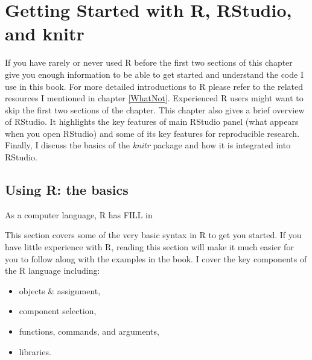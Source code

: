 



\chapter{Getting Started with R, RStudio, and knitr}\label{GettingStarted}

If you have rarely or never used R before the first two sections of this chapter give you enough information to be able to get started and understand the code I use in this book. For more detailed introductions to R please refer to the related resources I mentioned in chapter \ref{WhatNot}. Experienced R users might want to skip the first two sections of the chapter. This chapter also gives a brief overview of RStudio. It highlights the key features of main RStudio panel (what appears when you open RStudio) and some of its key features for reproducible research. Finally, I discuss the basics of the {\emph{knitr}} package and how it is integrated into RStudio.

\section{Using R: the basics}

As a computer language, R has FILL in

This section covers some of the very basic syntax in R to get you started. If you have little experience with R, reading this section will make it much easier for you to follow along with the examples in the book. I cover the key components of the R language including:

\begin{itemize}
    \item objects \& assignment,
    \item component selection,
    \item functions, commands, and arguments,
    \item libraries.
\end{itemize}


